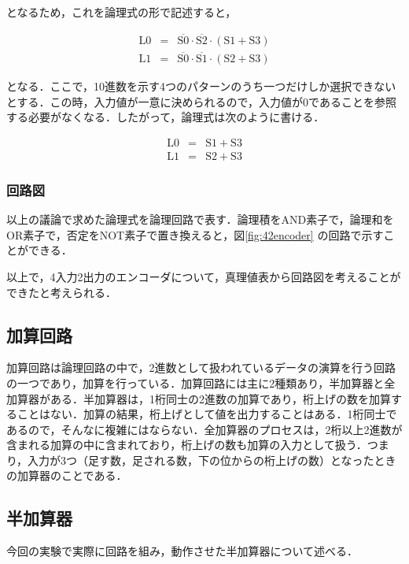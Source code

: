 となるため，これを論理式の形で記述すると，

\begin{eqnarray}
	\mathrm{L0} &=& \overline{\mathrm{S0}} \cdot \overline{\mathrm{S2}} \cdot (\mathrm{S1} + \mathrm{S3} ) \nonumber \\
	\mathrm{L1} &=& \overline{\mathrm{S0}} \cdot \overline{\mathrm{S1}} \cdot(\mathrm{S2} + \mathrm{S3} ) \nonumber 
\end{eqnarray}

となる．ここで，10進数を示す4つのパターンのうち一つだけしか選択できないとする．この時，入力値が一意に決められるので，入力値が0であることを参照する必要がなくなる．したがって，論理式は次のように書ける．

\begin{eqnarray}
	\mathrm{L0} &=& \mathrm{S1} + \mathrm{S3}  \nonumber \\
	\mathrm{L1} &=& \mathrm{S2} + \mathrm{S3} \nonumber 
\end{eqnarray}

%
%
\subsubsection{回路図}
以上の議論で求めた論理式を論理回路で表す．論理積をAND素子で，論理和をOR素子で，否定をNOT素子で置き換えると，図\ref{fig:42encoder} の回路で示すことができる．

以上で，4入力2出力のエンコーダについて，真理値表から回路図を考えることができたと考えられる．

%
% 
\subsection{加算回路}
\label{experiment_adder}
加算回路は論理回路の中で，2進数として扱われているデータの演算を行う回路の一つであり，加算を行っている．加算回路には主に2種類あり，半加算器と全加算器がある．半加算器は，1桁同士の2進数の加算であり，桁上げの数を加算することはない．加算の結果，桁上げとして値を出力することはある．1桁同士であるので，そんなに複雑にはならない．全加算器のプロセスは，2桁以上2進数が含まれる加算の中に含まれており，桁上げの数も加算の入力として扱う．つまり，入力が3つ（足す数，足される数，下の位からの桁上げの数）となったときの加算器のことである．

%
%
\subsection{半加算器}
\label{experiment_halfadder}
今回の実験で実際に回路を組み，動作させた半加算器について述べる．

